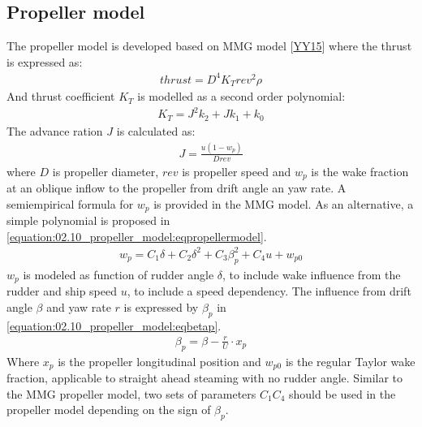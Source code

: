 \documentclass[review]{elsarticle}
\begin{document}
\subsection{Propeller model}
\label{\detokenize{02.10_propeller_model:propeller-model}}\label{\detokenize{02.10_propeller_model::doc}}
\sphinxAtStartPar
The propeller model is developed based on MMG model {[}\hyperlink{cite.bibligraphy:id22}{YY15}{]} where the thrust is expressed as:
\begin{equation}\label{equation:02.10_propeller_model:eqT}
\begin{split}\displaystyle thrust = D^{4} K_{T} rev^{2} \rho\end{split}
\end{equation}
\sphinxAtStartPar
And thrust coefficient \(K_T\) is modelled as a second order polynomial:
\begin{equation}\label{equation:02.10_propeller_model:eqkt}
\begin{split}\displaystyle K_{T} = J^{2} k_{2} + J k_{1} + k_{0}\end{split}
\end{equation}
\sphinxAtStartPar
The advance ration \(J\) is calculated as:
\begin{equation}\label{equation:02.10_propeller_model:eqJ}
\begin{split}\displaystyle J = \frac{u \left(1 - w_{p}\right)}{D rev}\end{split}
\end{equation}
\sphinxAtStartPar
where \(D\) is propeller diameter, \(rev\) is propeller speed and \(w_p\) is the wake fraction at an oblique inflow to the propeller from drift angle an yaw rate. A semi\sphinxhyphen{}empirical formula for \(w_p\) is provided in the MMG model. As an alternative, a simple polynomial is proposed in \autoref{equation:02.10_propeller_model:eqpropellermodel}.
\begin{equation}\label{equation:02.10_propeller_model:eqpropellermodel}
\begin{split}\displaystyle w_{p} = C_{1} \delta + C_{2} \delta^{2} + C_{3} \beta_{p}^{2} + C_{4} u + w_{p0}\end{split}
\end{equation}
\sphinxAtStartPar
\(w_p\) is modeled as function of rudder angle \(\delta\), to include wake influence from the rudder and ship speed \(u\), to include a speed dependency. The influence from drift angle \(\beta\) and yaw rate \(r\) is expressed by \(\beta_p\) in \autoref{equation:02.10_propeller_model:eqbetap}.
\begin{equation}\label{equation:02.10_propeller_model:eqbetap}
\begin{split}\beta_p=\beta - \frac{r}{U} \cdot x_p \end{split}
\end{equation}
\sphinxAtStartPar
Where \(x_p\) is the propeller longitudinal position and \(w_{p0}\) is the regular Taylor wake fraction, applicable to straight ahead steaming with no rudder angle. Similar to the MMG propeller model, two sets of parameters \(C_1\)\sphinxhyphen{}\(C_4\) should be used in the propeller model depending on the sign of \(\beta_p\).
\end{document}

